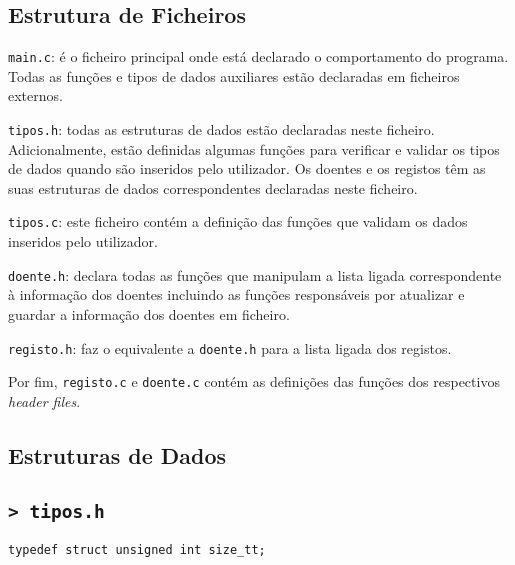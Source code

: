 \documentclass[a4paper, 12pt]{article}
\newcommand\code[1]{\texttt{\sloppy #1}}
\begin{document}
\subsection{Estrutura de Ficheiros}

\code{main.c}: é o ficheiro principal onde está declarado o comportamento do programa. Todas as funções e tipos de dados auxiliares estão declaradas em ficheiros externos.  

\code{tipos.h}: todas as estruturas de dados estão declaradas neste ficheiro. Adicionalmente, estão definidas algumas funções para verificar e validar os tipos de dados quando são inseridos pelo utilizador. Os doentes e os registos têm as suas estruturas de dados correspondentes declaradas neste ficheiro. 

\code{tipos.c}: este ficheiro contém a definição das funções que validam os dados inseridos pelo utilizador.


\code{doente.h}: declara todas as funções que manipulam a lista ligada correspondente à informação dos doentes incluindo as funções responsáveis por atualizar e guardar a informação dos doentes em ficheiro.

\code{registo.h}: faz o equivalente a \code{doente.h} para a lista ligada dos registos. 

Por fim, \code{registo.c} e \code{doente.c} contém as definições das funções dos respectivos \textit{header files}.

\subsection{Estruturas de Dados}

\subsection*{\code{> tipos.h}}


\begin{verbatim}
typedef struct unsigned int size_tt;
\end{verbatim}
\vspace{-1em}
\end{document}
